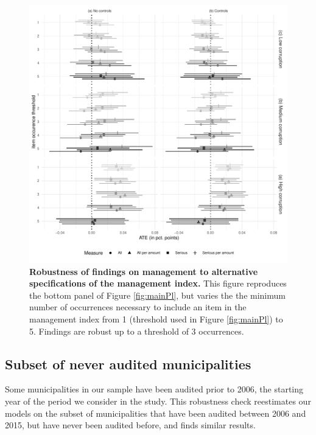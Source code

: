 {\begin{figure}[H]
    \centering
    \includegraphics{chapters/chapter_2/figures/mgmtRobust.pdf}
    \caption{{\bf Robustness of findings on management to alternative specifications of the management index.} This figure reproduces the bottom panel of Figure \ref{fig:mainPl}, but varies the the minimum number of occurrences necessary to include an item in the management index from 1 (threshold used in Figure \ref{fig:mainPl}) to 5. Findings are robust up to a threshold of 3 occurrences.}
    \label{fig:managementRobustness}
\end{figure}

\subsection{Subset of never audited municipalities}
\label{app:neverAuditedRobustness}

Some municipalities in our sample have been audited prior to 2006, the starting year of the period we consider in the study. This robustness check reestimates our models on the subset of municipalities that have been audited between 2006 and 2015, but have never been audited before, and finds similar results.

}
